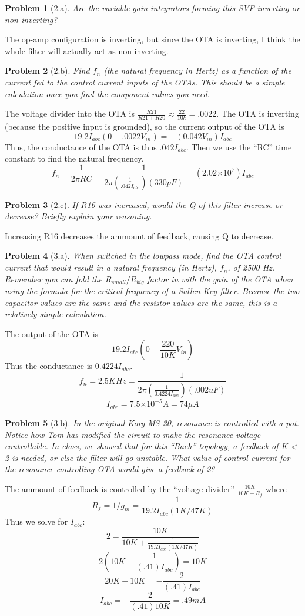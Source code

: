 \documentclass[12pt]{article}
\providecommand{\e}[1]{\ensuremath{\times 10^{#1}}}
\newtheorem*{prob}{Problem}
\begin{document}
\begin{prob}[2.a]{
  Are the variable-gain integrators forming this SVF inverting or non-inverting?
}\end{prob}
The op-amp configuration is inverting, but since the OTA is inverting, I think the whole filter will actually act as non-inverting.

\begin{prob}[2.b]{
  Find $f_n$ (the natural frequency in Hertz) as a function of the current fed to the control current inputs of the OTAs. This should be a simple calculation once you find the component values you need.
}\end{prob}
  The voltage divider into the OTA is $\frac{R21}{R21+R20}\approx \frac{22}{10k}= .0022$. The OTA is inverting (because the positive input is grounded), so the current output of the OTA is
    \[19.2 I_{abc}(0-.0022V_{in}) = -(0.042V_{in})I_{abc}\]
  Thus, the conductance of the OTA is thus $.042I_{abc}$. Then we use the ``RC'' time constant to find the natural frequency.
  \[f_n = \frac{1}{2\pi RC}=\frac{1}{2\pi (\frac{1}{.042I_{abc}})(330pF)} = (2.02\e{7})I_{abc}\]

\begin{prob}[2.c]{
  If R16 was increased, would the Q of this filter increase or decrease? Briefly explain your reasoning.
}\end{prob}
Increasing R16 decreases the ammount of feedback, causing Q to decrease.

\begin{prob}[3.a]{
When switched in the lowpass mode, find the OTA control current that would result in a natural frequency (in Hertz), $f_n$, of 2500 Hz. Remember you can fold the $R_{small}/R_{big}$ factor in with the gain of the OTA when using the formula for the critical frequency of a Sallen-Key filter. Because the two capacitor values are the same and the resistor values are the same, this is a relatively simple calculation.
}\end{prob}
The output of the OTA is
\[19.2I_{abc}(0-\frac{220}{10K}V_{in})\]
Thus the conductance is $0.4224I_{abc}$.
\[f_n = 2.5KHz = \frac{1}{2\pi (\frac{1}{0.4224I_{abc}})(.002uF)}\]
\[I_{abc} = 7.5\e{-5}A = 74\mu A \]

\begin{prob}[3.b]{
  In the original Korg MS-20, resonance is controlled with a pot. Notice how Tom has modified the circuit to make the resonance voltage controllable. In class, we showed that for this ``Bach'' topology, a feedback of K < 2 is needed, or else the filter will go unstable. What value of control current for the resonance-controlling OTA would give a feedback of 2?
}\end{prob}
The ammount of feedback is controlled by the ``voltage divider'' $\frac{10K}{10K+R_f}$ where
\[ R_f = 1/g_m = \frac{1}{19.2I_{abc}(1K/47K)}\]
Thus we solve for $I_{abc}$:
\[ 2 = \frac{10K}{10K+\frac{1}{19.2I_{abc}(1K/47K)}} \]
\[ 2\left(10K+\frac{1}{(.41)I_{abc}}\right) = 10K\]
\[20K-10K = -\frac{2}{(.41)I_{abc}} \]
\[I_{abc} = -\frac{2}{(.41)10K} = .49mA\]
\end{document}
